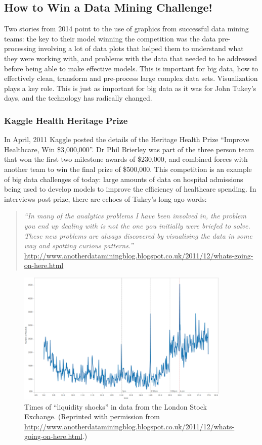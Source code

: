\documentclass{article}
\begin{document}
\subsection{How to Win a Data Mining Challenge!}

Two stories from 2014 point to the use of graphics from successful data mining teams: the key to their model winning the competition was the data pre-processing involving a lot of data plots that helped them to understand what they were working with, and problems with the data that needed to be addressed before being able to make effective models. This is important for big data, how to effectively clean, transform and pre-process large complex data sets. Visualization plays a key role. This is just as important for big data as it was for John Tukey's days, and the technology has radically changed.

\subsubsection{Kaggle Health Heritage Prize}

In April, 2011 Kaggle posted the details of the Heritage Health Prize ``Improve Healthcare, Win \$3,000,000''.  Dr Phil Brierley was part of the three person team that won the first two milestone awards of \$230,000, and combined forces with another team to win the final prize of \$500,000. This competition is an example of big data challenges of today: large amounts of data on hospital admissions being used to develop models to improve the efficiency of healthcare spending. In interviews post-prize, there are echoes of Tukey's long ago words:

\begin{quote}
{\em ``In many of the analytics problems I have been involved in, the problem you end up dealing with is not the one you initially were briefed to solve.
These new problems are always discovered by visualising the data in some way and spotting curious patterns.'' }\url{http://www.anotherdataminingblog.blogspot.co.uk/2011/12/whats-going-on-here.html}
\end{quote}

\begin{figure}[htp]
\centerline{\includegraphics[width=4in]{images/shockeventtimings.png}}
\caption{Times of ``liquidity shocks'' in data from the London Stock Exchange. (Reprinted with permission from \url{http://www.anotherdataminingblog.blogspot.co.uk/2011/12/whats-going-on-here.html}.)}
\label{liqshock}
\end{figure}
\end{document}
